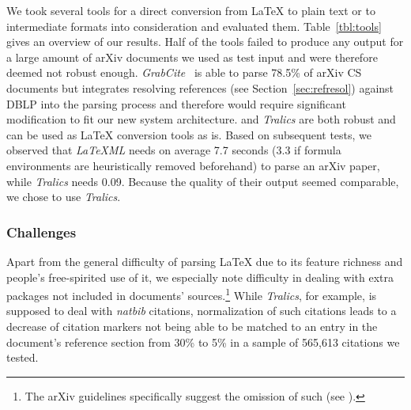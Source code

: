 We took several tools for a direct conversion from \LaTeX{} to plain text or to intermediate formats into consideration and evaluated them. Table~\ref{tbl:tools} gives an overview of our results. Half of the tools failed to produce any output for a large amount of arXiv documents we used as test input and were therefore deemed not robust enough. \textit{GrabCite}~\cite{Faerber2018LREC} is able to parse 78.5\%
of arXiv CS documents but integrates resolving references (see Section~\ref{sec:refresol}) against DBLP into the parsing process and therefore would require significant modification to fit our new system architecture. \textit{\LaTeXML{}} and \textit{Tralics} are both robust and can be used as \LaTeX{} conversion tools as is. Based on subsequent tests, we observed that \textit{LaTeXML} needs on average 7.7 seconds (3.3 if formula environments are heuristically removed beforehand) to parse an arXiv paper, while \textit{Tralics} needs 0.09. Because the quality of their output seemed comparable, we chose to use \textit{Tralics}.

\subsubsection{Challenges}\label{sec:refresolchallenges}
Apart from the general difficulty of parsing \LaTeX{} due to its feature richness and people's free-spirited use of it, we especially note difficulty in dealing with extra packages not included in documents' sources.\footnote{The arXiv guidelines specifically suggest the omission of such (see ).} While \textit{Tralics}, for example, is supposed to deal with \textit{natbib} citations, normalization of such citations leads to a decrease of citation markers not being able to be matched to an entry in the document's reference section from 30\% to 5\% in a sample of 565,613 citations we tested.

